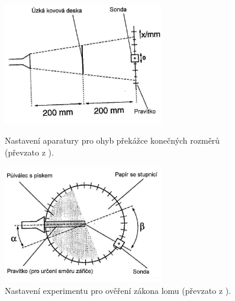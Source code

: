 \documentclass[english]{article}
\begin{document}
	\begin{figure}[h!]
	\centering
	\begin{minipage}{.45\textwidth}
	  \centering
			\includegraphics[width=7cm]{att/ohyb_na_prekazce.jpg}
			\caption{Nastavení aparatury pro ohyb překážce konečných rozměrů (převzato z  \cite{bib:zadani}).}
			\label{fig:ohyb_na_prekazce}
	\end{minipage}%
	\hfill
	\begin{minipage}{.45\textwidth}
	  \centering
			\includegraphics[width=7cm]{att/zakon_lomu.jpg}
			\caption{Nastavení experimentu pro ověření zákona lomu (převzato z  \cite{bib:zadani}).}
			\label{fig:zakon_lomu}
	\end{minipage}
	\end{figure}	
	
\end{document}
